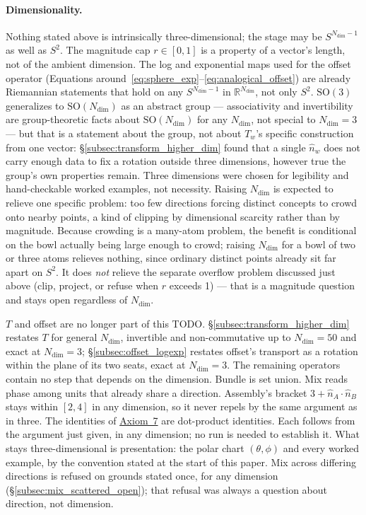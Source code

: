 \documentclass[12pt, a4paper]{article}
\begin{document}
\paragraph{Dimensionality.}
\label{subsec:dimensionality_open}
Nothing stated
above is intrinsically three-dimensional; the stage may be
$S^{N_{\mathrm{dim}}-1}$ as well as $S^2$. The magnitude cap
$r\in[0,1]$ is a property of a vector's length, not of the ambient
dimension. The log and exponential maps used for the offset operator
(Equations around~\eqref{eq:sphere_exp}--\eqref{eq:analogical_offset})
are already Riemannian statements that hold on any $S^{N_{\mathrm{dim}}-1}$ in
$\mathbb{R}^{N_{\mathrm{dim}}}$, not only $S^2$. $\mathrm{SO}(3)$ generalizes to
$\mathrm{SO}(N_{\mathrm{dim}})$ as an abstract group --- associativity and
invertibility are group-theoretic facts about $\mathrm{SO}(N_{\mathrm{dim}})$ for
any $N_{\mathrm{dim}}$, not special to $N_{\mathrm{dim}}=3$ --- but that is a statement about the
group, not about $T_w$'s specific construction from one vector:
\S\ref{subsec:transform_higher_dim} found that a single $\hat n_w$
does not carry enough data to fix a rotation outside three
dimensions, however true the group's own properties remain. Three
dimensions were chosen for legibility and hand-checkable worked
examples, not necessity. Raising $N_{\mathrm{dim}}$ is expected to relieve one
specific problem: too few directions forcing distinct concepts to
crowd onto nearby points, a kind of clipping by dimensional scarcity
rather than by magnitude. Because crowding is a many-atom problem, the
benefit is conditional on the bowl actually being large enough to
crowd; raising $N_{\mathrm{dim}}$ for a bowl of two or three atoms relieves nothing,
since ordinary distinct points already sit far apart on $S^2$. It does
\emph{not} relieve the separate
overflow problem discussed just above (clip, project, or refuse when
$r$ exceeds 1) --- that is a magnitude question and stays open
regardless of $N_{\mathrm{dim}}$.

$T$ and offset are no longer part of this TODO.
\S\ref{subsec:transform_higher_dim} restates $T$ for general
$N_{\mathrm{dim}}$, invertible and non-commutative up to
$N_{\mathrm{dim}}=50$ and exact at $N_{\mathrm{dim}}=3$;
\S\ref{subsec:offset_logexp} restates offset's transport as a
rotation within the plane of its two seats, exact at
$N_{\mathrm{dim}}=3$. The remaining operators contain no step that
depends on the dimension. Bundle is set union. Mix reads phase among
units that already share a direction. Assembly's bracket
$3+\hat n_A\cdot\hat n_B$ stays within $[2,4]$ in any dimension, so it
never repels by the same argument as in three. The identities of
\hyperref[subsec:axiom_v1_metrics]{Axiom~7} are dot-product
identities. Each follows from the argument just given, in any
dimension; no run is needed to establish it. What stays three-dimensional is presentation: the
polar chart $(\theta,\phi)$ and every worked example, by the
convention stated at the start of this paper. Mix across differing
directions is refused on grounds stated once, for any dimension
(\S\ref{subsec:mix_scattered_open}); that refusal was always a
question about direction, not dimension.
\end{document}
